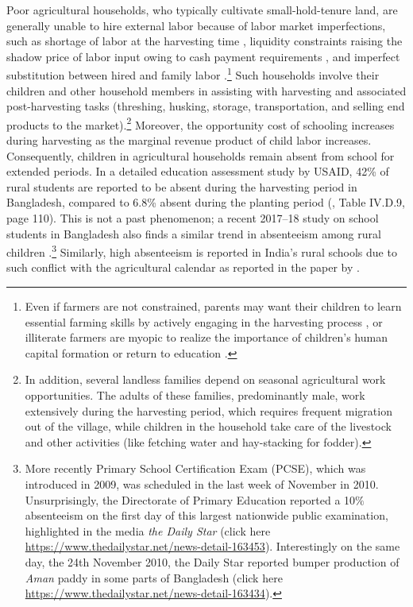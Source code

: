 \documentclass[12pt,letterpaper]{article}
\newcommand{\0}{\ensuremath{\mbox{\boldmath $0$}}}
\begin{document}
Poor agricultural households, who typically cultivate small-hold-tenure land, are generally unable to hire external labor because of labor market imperfections, such as shortage of labor at the harvesting time \citep{rosenzweig1988labor}, liquidity constraints raising the shadow price of labor input owing to cash payment requirements \citep{singh1986agricultural}, and imperfect substitution between hired and family labor \citep{de1991peasant}.\footnote{Even if farmers are not constrained, parents may want their children to learn essential farming skills by actively engaging in the harvesting process \citep{bhalotra2003child}, or illiterate farmers are myopic to realize the importance of children’s human capital formation or return to education \citep{BalandRobinson2000}.} Such households involve their children and other household members in assisting with harvesting and associated post-harvesting tasks (threshing, husking, storage, transportation, and selling end products to the market).\footnote{In addition, several landless families depend on seasonal agricultural work opportunities. The adults of these families, predominantly male, work extensively during the harvesting period, which requires frequent migration out of the village, while children in the household take care of the livestock and other activities (like fetching water and hay-stacking for fodder).} Moreover, the opportunity cost of schooling increases during harvesting as the marginal revenue product of child labor increases. Consequently, children in agricultural households remain absent from school for extended periods. In a detailed education assessment study by USAID, 42\% of rural students are reported to be absent during the harvesting period in Bangladesh, compared to 6.8\% absent during the planting period (\cite{Rahman2004}, Table IV.D.9, page 110). This is not a past phenomenon; a recent 2017–18 study on school students in Bangladesh also finds a similar trend in absenteeism among rural children \citep{Fujii2019}.\footnote{More recently Primary School Certification Exam (PCSE), which was introduced in 2009, was scheduled in the last week of November in 2010. Unsurprisingly, the Directorate of Primary Education reported a 10$\%$ absenteeism on the first day of this largest nationwide public examination, highlighted in the media \textit{the Daily Star} (click here \url{https://www.thedailystar.net/news-detail-163453}). Interestingly on the same day, the 24th November 2010, the Daily Star reported bumper production of \textit{Aman} paddy in some parts of Bangladesh (click here \url{https://www.thedailystar.net/news-detail-163434}).} Similarly, high absenteeism is reported in India's rural schools due to such conflict with the agricultural calendar as reported in the paper by \cite{de2016estimating}.
\end{document}

